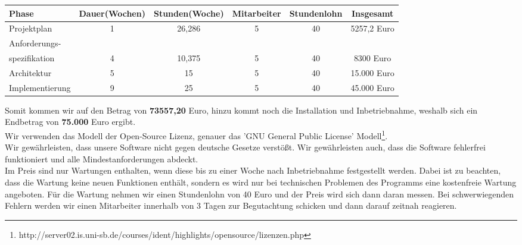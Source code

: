 \documentclass[fontsize=12pt,paper=a4,twoside]{scrartcl}
\begin{document}
\begin{table}[htbp]
\begin{tabular}{|p{3cm}|c|c|c|c|c|}
\hline 
Phase & Dauer(Wochen) & Stunden(Woche) & Mitarbeiter & Stundenlohn & Insgesamt \\ \hline \hline
Projektplan & 1 & 26,286 & 5 & 40 & 5257,2 Euro\\ \hline
Anforderungs- & & & & & \\ 
spezifikation & 4 & 10,375 & 5 & 40 & 8300 Euro\\ \hline
Architektur & 5 & 15 & 5 & 40 & 15.000 Euro\\ \hline
Implementierung & 9 & 25 & 5 & 40 & 45.000 Euro\\ \hline
\end{tabular}
\end{table}
Somit kommen wir auf den Betrag von \textbf{73557,20} Euro, hinzu kommt noch die Installation und Inbetriebnahme, weshalb sich ein Endbetrag von \textbf{75.000} Euro ergibt.\\
Wir verwenden das Modell der Open-Source Lizenz, genauer das 'GNU General Public License' Modell\footnote{http://server02.is.uni-sb.de/courses/ident/highlights/opensource/lizenzen.php}.\\
Wir gewährleisten, dass unsere Software nicht gegen deutsche Gesetze verstößt. Wir gewährleisten auch, dass die Software fehlerfrei funktioniert und alle Mindestanforderungen abdeckt.\\
Im Preis sind nur Wartungen enthalten, wenn diese bis zu einer Woche nach Inbetriebnahme festgestellt werden. Dabei ist zu beachten, dass die Wartung keine neuen Funktionen enthält, sondern es wird nur bei technischen Problemen des Programms eine kostenfreie Wartung angeboten. Für die Wartung nehmen wir einen Stundenlohn von 40 Euro und der Preis wird sich dann daran messen. Bei schwerwiegenden Fehlern werden wir einen Mitarbeiter innerhalb von 3 Tagen zur Begutachtung schicken und dann darauf zeitnah reagieren. 
\end{document}

